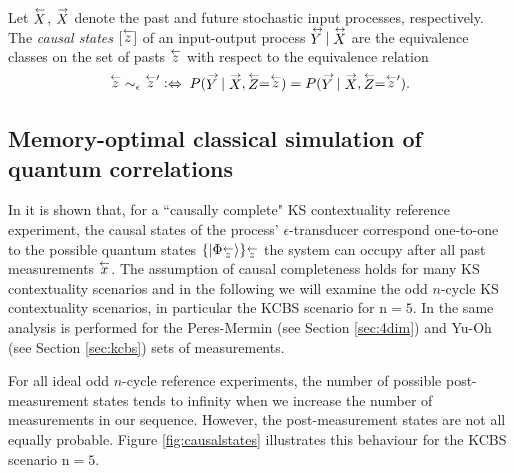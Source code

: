 \begin{definition}
Let $\oset{\leftarrow}{X}$, $\oset{\rightarrow}{X}$ denote the past and future stochastic input processes, respectively.
The \emph{causal states} $[\oset{\leftarrow}{z}]$ of an input-output process $\oset{\leftrightarrow}{Y}|\oset{\leftrightarrow}{X}$ are the equivalence classes on the set of pasts $\oset{\leftarrow}{z}$ with respect to the equivalence relation
\begin{equation*}
\oset{\leftarrow}{z}\;\sim_\epsilon\;\oset{\leftarrow}{z}'\;\mathrel{\vcentcolon\Leftrightarrow} \;P(\oset{\rightarrow}{Y}|\oset{\rightarrow}{X},\oset{\leftarrow}{Z}=\oset{\leftarrow}{z})= P(\oset{\rightarrow}{Y}|\oset{\rightarrow}{X},\oset{\leftarrow}{Z}=\oset{\leftarrow}{z}').
\end{equation*}
\end{definition}

\subsection{Memory-optimal classical simulation of quantum correlations}
In \cite{Cabello2018} it is shown that, for a ``causally complete" KS contextuality reference experiment, the causal states of the process' $\epsilon$-transducer correspond one-to-one to the possible quantum states $\{\ket{\Phi_{\oset{\leftarrow}{z}}}\}_{\oset{\leftarrow}{z}}$ the system can occupy after all past measurements $\oset{\leftarrow}{x}$. The assumption of causal completeness holds for many KS contextuality scenarios and in the following we will examine the odd $n$-cycle KS contextuality scenarios, in particular the KCBS scenario for $\text{n}=5$. In \cite{Cabello2018} the same analysis is performed for the Peres-Mermin (see Section \ref{sec:4dim}) and Yu-Oh (see Section \ref{sec:kcbs}) sets of measurements.

For all ideal odd $n$-cycle reference experiments, the number of possible post-measurement states tends to infinity when we increase the number of measurements in our sequence. However, the post-measurement states are not all equally probable. Figure \ref{fig:causalstates} illustrates this behaviour for the KCBS scenario $\text{n}=5$.

